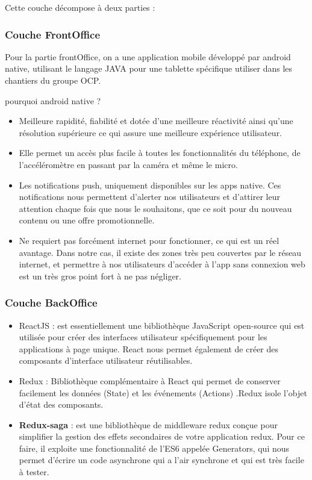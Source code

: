 Cette couche d\'ecompose \`a deux parties :

\subsubsection{Couche FrontOffice}

Pour la partie frontOffice, on a une application mobile d\'evelopp\'e par android native, utilisant le langage JAVA pour une tablette sp\'ecifique utiliser dans les chantiers du groupe \gls{OCP}. 

pourquoi android native ? 

\begin{itemize}
\item Meilleure rapidit\'e, fiabilit\'e et dot\'ee d'une meilleure r\'eactivit\'e ainsi qu'une r\'esolution sup\'erieure ce qui assure une meilleure exp\'erience utilisateur.
\item Elle permet un acc\`es plus facile \`a toutes les fonctionnalit\'es du t\'el\'ephone, de l'acc\'el\'erom\`etre en passant par la cam\'era et m\^eme le micro.
\item Les notifications push, uniquement disponibles sur les apps native. Ces notifications nous permettent d'alerter nos utilisateurs et d'attirer leur attention chaque fois que nous le souhaitons, que ce soit pour du nouveau contenu ou une offre promotionnelle.
\item Ne requiert pas forc\'ement internet pour fonctionner, ce qui est un r\'eel avantage. Dans notre cas, il existe des zones tr\`es peu couvertes par le r\'eseau internet, et permettre \`a nos utilisateurs d'acc\'eder \`a l'app sans connexion web est un tr\`es gros point fort \`a ne pas n\'egliger.
\end{itemize}

\subsubsection{Couche BackOffice}
\begin{itemize}

\item \textcolor{react}{ReactJS} : est essentiellement une biblioth\`eque JavaScript open-source qui est utilis\'ee pour cr\'eer des interfaces utilisateur sp\'ecifiquement pour les applications \`a page unique. React nous permet \'egalement de cr\'eer des composants d'interface utilisateur r\'eutilisables.

\item \textcolor{redux}{Redux} : Biblioth\`eque compl\'ementaire \`a React qui permet de conserver facilement les donn\'ees (State) et les \'ev\'enements (Actions) .Redux isole l'objet d'\'etat des composants.

\item \textbf{Redux-saga} : est une biblioth\`eque de middleware redux con\c{c}ue pour simplifier la gestion des effets secondaires de votre application redux. Pour ce faire, il exploite une fonctionnalit\'e de l'ES6 appel\'ee Generators, qui nous permet d'\'ecrire un code asynchrone qui a l'air synchrone et qui est tr\`es facile \`a tester.
\end{itemize}


